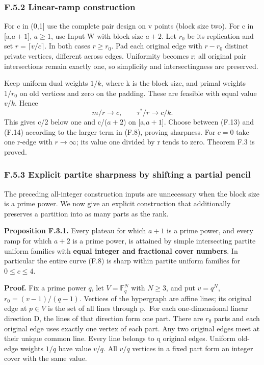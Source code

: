 \documentclass[
  11pt,
]{article}
\begin{document}
\subsubsection{F.5.2 Linear-ramp
construction}\label{f.5.2-linear-ramp-construction}

For c in (0,1{]} use the complete pair design on v points (block size
two). For c in {[}a,\(a+1\){]}, \(a\ge1\), use Input W with block size
\(a+2\). Let \(r_0\) be its replication and set \(r=\lceil v/c\rceil\).
In both cases \(r\ge r_0\). Pad each original edge with \(r-r_0\)
distinct private vertices, different across edges. Uniformity becomes r;
all original pair intersections remain exactly one, so simplicity and
intersectingness are preserved.

Keep uniform dual weights \(1/k\), where k is the block size, and primal
weights \(1/r_0\) on old vertices and zero on the padding. These are
feasible with equal value \(v/k\). Hence \[
                  m/r\to c,\qquad\tau^*/r\to c/k.           \tag{F.14}
\] This gives c/2 below one and c/(\(a+2\)) on {[}a,\(a+1\){]}. Choose
between (F.13) and (F.14) according to the larger term in (F.8), proving
sharpness. For \(c=0\) take one r-edge with \(r\to\infty\); its value
one divided by r tends to zero. Theorem F.3 is proved.

\subsubsection{F.5.3 Explicit partite sharpness by shifting a partial
pencil}\label{f.5.3-explicit-partite-sharpness-by-shifting-a-partial-pencil}

The preceding all-integer construction inputs are unnecessary when the
block size is a prime power. We now give an explicit construction that
additionally preserves a partition into as many parts as the rank.

\textbf{Proposition F.3.1.} Every plateau for which \(a+1\) is a prime
power, and every ramp for which \(a+2\) is a prime power, is attained by
simple intersecting partite uniform families with \textbf{equal integer
and fractional cover numbers}. In particular the entire curve (F.8) is
sharp within partite uniform families for \(0\le c\le4\).

\textbf{Proof.} Fix a prime power \(q\), let \(V=\mathbb F_q^N\) with
\(N\ge3\), and put \(v=q^N\), \(r_0=(v-1)/(q-1)\). Vertices of the
hypergraph are affine lines; its original edge at \(p\in V\) is the set
of all lines through p.~For each one-dimensional linear direction D, the
lines of that direction form one part. There are \(r_0\) parts and each
original edge uses exactly one vertex of each part. Any two original
edges meet at their unique common line. Every line belongs to q original
edges. Uniform old-edge weights \(1/q\) have value \(v/q\). All \(v/q\)
vertices in a fixed part form an integer cover with the same value.
\end{document}
